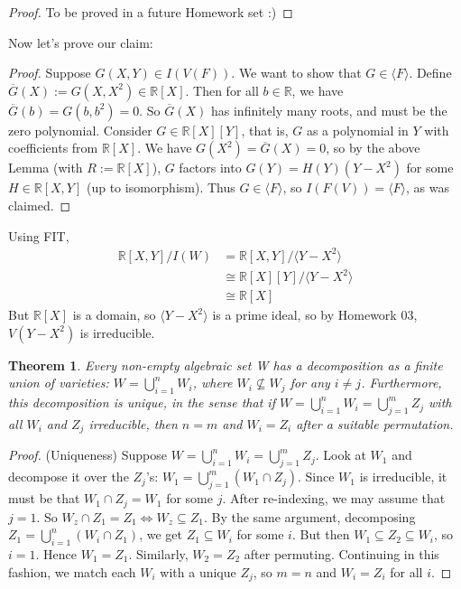 \documentclass[12pt]{article}
\newcommand{\real}{\mathbb{R}}
\newcommand{\vbrack}[1]{\langle #1\rangle}
\newtheorem{theorem}{Theorem}[section]
\theoremstyle{definition}
\begin{document}
\begin{proof}
    To be proved in a future Homework set :)
\end{proof}
Now let's prove our claim:
\begin{proof}
    Suppose $G(X,Y)\in I(V(F))$. We want to show that $G\in\vbrack{F}$. Define $\overline{G}(X):=G(X,X^2)\in\real[X]$. Then for all $b\in\real$, we have $\overline{G}(b)=G(b,b^2)=0$. So $\overline{G}(X)$ has infinitely many roots, and must be the zero polynomial. Consider $G\in\real[X][Y]$, that is, $G$ as a polynomial in $Y$ with coefficients from $\real[X]$. We have $G(X^2)=\overline{G}(X)=0$, so by the above Lemma (with $R:=\real[X]$), $G$ factors into $G(Y)=H(Y)(Y-X^2)$ for some $H\in\real[X,Y]$ (up to isomorphism). Thus $G\in\vbrack{F}$, so $I(F(V))=\vbrack{F}$, as was claimed.
\end{proof}
Using FIT,
\begin{equation*}
    \begin{split}
        \real[X,Y]/I(W)&=\real[X,Y]/\vbrack{Y-X^2}\\
        &\cong\real[X][Y]/\vbrack{Y-X^2}\\
        &\cong\real[X]
    \end{split}
\end{equation*}
But $\real[X]$ is a domain, so $\vbrack{Y-X^2}$ is a prime ideal, so by Homework 03, $V(Y-X^2)$ is irreducible.
\begin{theorem}
    Every non-empty algebraic set W has a decomposition as a finite union of varieties: $W=\bigcup\limits_{i=1}^nW_i$, where $W_i\not\subseteq W_j$ for any $i\neq j$. Furthermore, this decomposition is unique, in the sense that if $W=\bigcup\limits_{i=1}^nW_i=\bigcup\limits_{j=1}^mZ_j$ with all $W_i$ and $Z_j$ irreducible, then $n=m$ and $W_i=Z_i$ after a suitable permutation.
\end{theorem}
\begin{proof}
    (Uniqueness) Suppose $W=\bigcup\limits_{i=1}^nW_i=\bigcup\limits_{j=1}^mZ_j$. Look at $W_1$ and decompose it over the $Z_j$'s: $W_1=\bigcup\limits_{j=1}^m(W_1\cap Z_j)$. Since $W_1$ is irreducible, it must be that $W_1\cap Z_j=W_1$ for some $j$. After re-indexing, we may assume that $j=1$. So $W_z\cap Z_1=Z_1\iff W_z\subseteq Z_1$. By the same argument, decomposing $Z_1=\bigcup\limits_{i=1}^n(W_i\cap Z_1)$, we get $Z_1\subseteq W_i$ for some $i$. But then $W_1\subseteq Z_2\subseteq W_i$, so $i=1$. Hence $W_1=Z_1$. Similarly, $W_2=Z_2$ after permuting. Continuing in this fashion, we match each $W_i$ with a unique $Z_j$, so $m=n$ and $W_i=Z_i$ for all $i$.
\end{proof}
\end{document}
